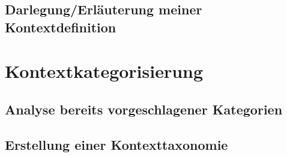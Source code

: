 
\subsection{Darlegung/Erläuterung meiner Kontextdefinition}

\section{Kontextkategorisierung}

		\subsection{ Analyse bereits vorgeschlagener Kategorien} 
		\subsection{ Erstellung einer Kontexttaxonomie }

